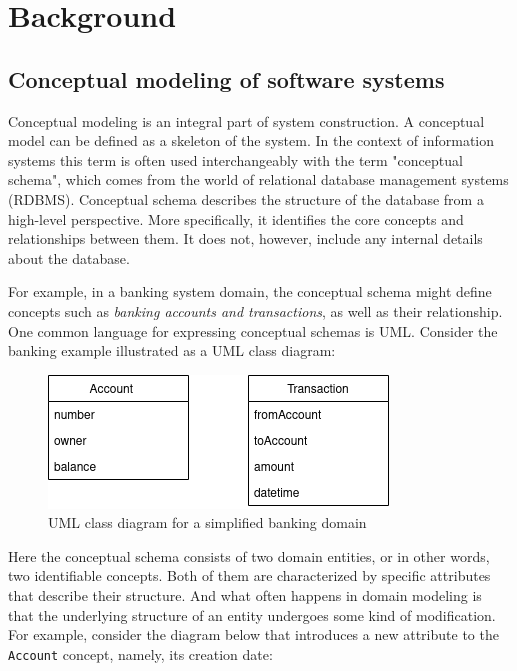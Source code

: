\chapter{Background}

\section{Conceptual modeling of software systems}

Conceptual modeling is an integral part of system construction. A conceptual model can be defined as a skeleton of the system. In the context of information systems this term is often used interchangeably with the term "conceptual schema", which comes from the world of relational database management systems (RDBMS). Conceptual schema describes the structure of the database from a high-level perspective. More specifically, it identifies the core concepts and relationships between them. It does not, however, include any internal details about the database.

\n

For example, in a banking system domain, the conceptual schema might define concepts such as \textit{banking accounts and transactions}, as well as their relationship. One common language for expressing conceptual schemas is UML. Consider the banking example illustrated as a UML class diagram:

\begin{figure}[H]\centering
    \includegraphics[scale=0.65]{images/banking.drawio.png}
    \caption{UML class diagram for a simplified banking domain}\label{fig:bank}
\end{figure}

Here the conceptual schema consists of two domain entities, or in other words, two identifiable concepts. Both of them are characterized by specific attributes that describe their structure. And what often happens in domain modeling is that the underlying structure of an entity undergoes some kind of modification. For example, consider the diagram below that introduces a new attribute to the \texttt{Account} concept, namely, its creation date:

